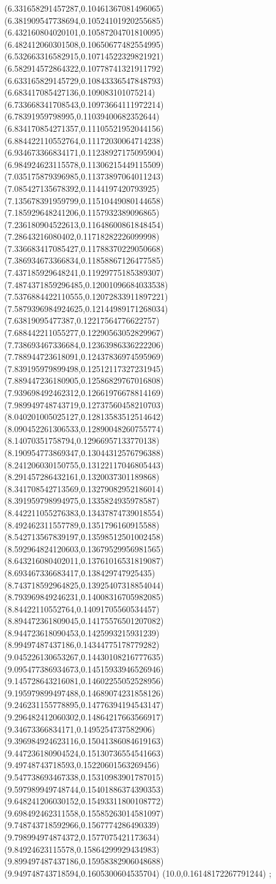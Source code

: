 {(6.331658291457287,0.10461367081496065)
(6.381909547738694,0.10524101920255685)
(6.432160804020101,0.10587204701810095)
(6.482412060301508,0.10650677482554995)
(6.532663316582915,0.10714522329821921)
(6.582914572864322,0.10778741321911792)
(6.633165829145729,0.10843336547848793)
(6.683417085427136,0.109083101075214)
(6.733668341708543,0.10973664111972214)
(6.78391959798995,0.11039400682352644)
(6.834170854271357,0.11105521952044156)
(6.884422110552764,0.11172030064714238)
(6.934673366834171,0.11238927175095904)
(6.984924623115578,0.11306215449115509)
(7.035175879396985,0.11373897064011243)
(7.085427135678392,0.1144197420793925)
(7.135678391959799,0.11510449080144658)
(7.185929648241206,0.1157932389096865)
(7.236180904522613,0.11648600861848454)
(7.28643216080402,0.11718282226099998)
(7.336683417085427,0.11788370229050668)
(7.386934673366834,0.11858867126477585)
(7.437185929648241,0.11929775185389307)
(7.4874371859296485,0.12001096684033538)
(7.5376884422110555,0.12072833911897221)
(7.5879396984924625,0.12144989171268034)
(7.63819095477387,0.12217564776622757)
(7.688442211055277,0.12290563052829967)
(7.738693467336684,0.12363986336222206)
(7.788944723618091,0.12437836974595969)
(7.839195979899498,0.12512117327231945)
(7.889447236180905,0.12586829767016808)
(7.939698492462312,0.12661976678814169)
(7.989949748743719,0.12737560458210703)
(8.040201005025127,0.12813583512514642)
(8.090452261306533,0.12890048260755774)
(8.14070351758794,0.12966957133770138)
(8.190954773869347,0.13044312576796388)
(8.241206030150755,0.13122117046805443)
(8.291457286432161,0.1320037301189868)
(8.341708542713569,0.13279082952186014)
(8.391959798994975,0.1335824935978587)
(8.442211055276383,0.13437874739018554)
(8.492462311557789,0.1351796160915588)
(8.542713567839197,0.13598512501002458)
(8.592964824120603,0.13679529956981565)
(8.643216080402011,0.13761016531819087)
(8.693467336683417,0.138429747925435)
(8.743718592964825,0.13925407318854044)
(8.793969849246231,0.14008316705982085)
(8.84422110552764,0.14091705560534457)
(8.894472361809045,0.14175576501207082)
(8.944723618090453,0.1425993215931239)
(8.99497487437186,0.14344775178779282)
(9.045226130653267,0.14430108216777635)
(9.095477386934673,0.14515933946526946)
(9.145728643216081,0.14602255052528956)
(9.195979899497488,0.14689074231858126)
(9.246231155778895,0.14776394194543147)
(9.296482412060302,0.14864217663566917)
(9.34673366834171,0.1495254737582906)
(9.396984924623116,0.15041386084619163)
(9.447236180904524,0.15130736554541663)
(9.49748743718593,0.15220601563269456)
(9.547738693467338,0.15310983901787015)
(9.597989949748744,0.15401886374390353)
(9.648241206030152,0.15493311800108772)
(9.698492462311558,0.15585263014581097)
(9.748743718592966,0.1567774286490339)
(9.798994974874372,0.1577075421173634)
(9.84924623115578,0.15864299929434983)
(9.899497487437186,0.15958382906048688)
(9.949748743718594,0.1605300604535704)
(10.0,0.16148172267791244)
};
